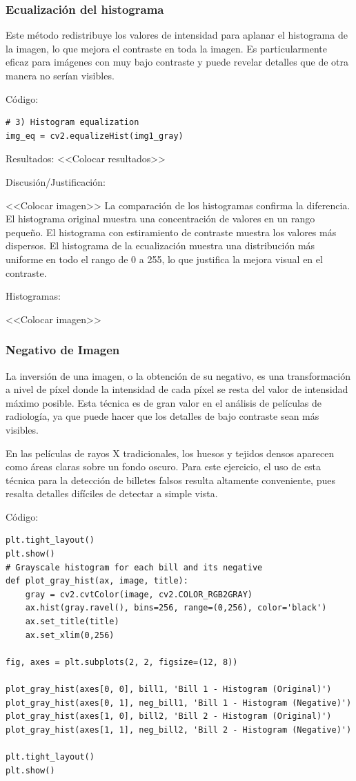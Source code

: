 \documentclass[12pt,letterpaper]{article}
\begin{document}
\subsubsection{Ecualización del histograma}
Este método redistribuye los valores de intensidad para aplanar el histograma de la imagen, lo que mejora el contraste en toda la imagen. Es particularmente eficaz para imágenes con muy bajo contraste y puede revelar detalles que de otra manera no serían visibles.


Código:
\begin{verbatim}
# 3) Histogram equalization
img_eq = cv2.equalizeHist(img1_gray)
\end{verbatim}

Resultados:
<<Colocar resultados>>


Discusión/Justificación:

<<Colocar imagen>>
La comparación de los histogramas confirma la diferencia. El histograma original muestra una concentración de valores en un rango pequeño. El histograma con estiramiento de contraste muestra los valores más dispersos. El histograma de la ecualización muestra una distribución más uniforme en todo el rango de 0 a 255, lo que justifica la mejora visual en el contraste.

Histogramas:

<<Colocar imagen>>

\subsubsection{Negativo de Imagen}

La inversión de una imagen, o la obtención de su negativo, es una transformación a nivel de píxel donde la intensidad de cada píxel se resta del valor de intensidad máximo posible. Esta técnica es de gran valor en el análisis de películas de radiología, ya que puede hacer que los detalles de bajo contraste sean más visibles.

En las películas de rayos X tradicionales, los huesos y tejidos densos aparecen como áreas claras sobre un fondo oscuro. Para este ejercicio, el uso de esta técnica para la detección de billetes falsos resulta altamente conveniente, pues resalta detalles difíciles de detectar a simple vista.



Código:
\begin{verbatim}
plt.tight_layout()
plt.show()
# Grayscale histogram for each bill and its negative
def plot_gray_hist(ax, image, title):
    gray = cv2.cvtColor(image, cv2.COLOR_RGB2GRAY)
    ax.hist(gray.ravel(), bins=256, range=(0,256), color='black')
    ax.set_title(title)
    ax.set_xlim(0,256)

fig, axes = plt.subplots(2, 2, figsize=(12, 8))

plot_gray_hist(axes[0, 0], bill1, 'Bill 1 - Histogram (Original)')
plot_gray_hist(axes[0, 1], neg_bill1, 'Bill 1 - Histogram (Negative)')
plot_gray_hist(axes[1, 0], bill2, 'Bill 2 - Histogram (Original)')
plot_gray_hist(axes[1, 1], neg_bill2, 'Bill 2 - Histogram (Negative)')

plt.tight_layout()
plt.show()
\end{verbatim}
\end{document}
